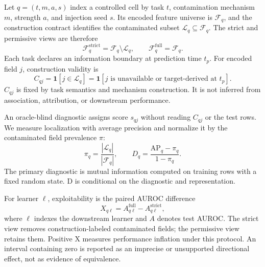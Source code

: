 \documentclass[sigconf,review]{acmart}
\begin{document}
Let $q=(t,m,a,s)$ index a controlled cell by task $t$, contamination
mechanism $m$, strength $a$, and injection seed $s$. Its encoded feature
universe is $\mathcal{F}_q$, and the construction contract identifies the
contaminated subset $\mathcal{L}_q\subseteq\mathcal{F}_q$. The strict and
permissive views are therefore
\begin{equation}
 \mathcal{F}^{\mathrm{strict}}_q=\mathcal{F}_q\setminus\mathcal{L}_q,
 \qquad
 \mathcal{F}^{\mathrm{full}}_q=\mathcal{F}_q.
 \label{eq:feature-views}
\end{equation}
Each task declares an information boundary at prediction time $t_p$. For
encoded field $j$, construction validity is
\begin{equation}
  C_{qj}=\mathbf{1}\!\left[j\in\mathcal{L}_q\right]
  =\mathbf{1}\!\left[j\text{ is unavailable or target-derived at }t_p\right].
  \label{eq:construction-validity}
\end{equation}
$C_{qj}$ is fixed by task semantics and mechanism construction. It is not inferred
from association, attribution, or downstream performance.

An oracle-blind diagnostic assigns score $s_{qj}$ without reading $C_{qj}$ or the
test rows. We measure localization with average precision and normalize it by
the contaminated field prevalence $\pi$:
\begin{equation}
  \pi_q=\frac{|\mathcal{L}_q|}{|\mathcal{F}_q|},
  \qquad
  D_q = \frac{\mathrm{AP}_q-\pi_q}{1-\pi_q}.
  \label{eq:detectability}
\end{equation}
The primary diagnostic is mutual information computed on training rows with a
fixed random state. D is conditional on the diagnostic and representation.

For learner $\ell$, exploitability is the paired AUROC difference
\begin{equation}
  X_{q\ell} = A^{\mathrm{full}}_{q\ell}
      - A^{\mathrm{strict}}_{q\ell},
  \label{eq:exploitability}
\end{equation}
where $\ell$ indexes the downstream learner and $A$ denotes test AUROC.
The strict view removes construction-labeled contaminated fields; the
permissive view retains them. Positive X measures performance inflation under
this protocol. An interval containing zero is reported as an imprecise or
unsupported directional effect, not as evidence of equivalence.
\end{document}
